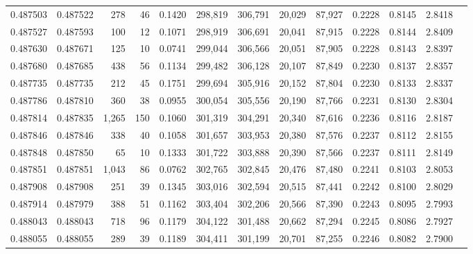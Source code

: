 \begin{tabular}{rrrrrrrrrrrrr}
0.487503 & 0.487522 &   278 &    46 &                                     0.1420 & 298,819 & 306,791 &  20,029 &  87,927 & 0.2228 & 0.8145 & 2.8418 \\
0.487527 & 0.487593 &   100 &    12 &                                     0.1071 & 298,919 & 306,691 &  20,041 &  87,915 & 0.2228 & 0.8144 & 2.8409 \\
0.487630 & 0.487671 &   125 &    10 &                                     0.0741 & 299,044 & 306,566 &  20,051 &  87,905 & 0.2228 & 0.8143 & 2.8397 \\
0.487680 & 0.487685 &   438 &    56 &                                     0.1134 & 299,482 & 306,128 &  20,107 &  87,849 & 0.2230 & 0.8137 & 2.8357 \\
0.487735 & 0.487735 &   212 &    45 &                                     0.1751 & 299,694 & 305,916 &  20,152 &  87,804 & 0.2230 & 0.8133 & 2.8337 \\
0.487786 & 0.487810 &   360 &    38 &                                     0.0955 & 300,054 & 305,556 &  20,190 &  87,766 & 0.2231 & 0.8130 & 2.8304 \\
0.487814 & 0.487835 & 1,265 &   150 &                                     0.1060 & 301,319 & 304,291 &  20,340 &  87,616 & 0.2236 & 0.8116 & 2.8187 \\
0.487846 & 0.487846 &   338 &    40 &                                     0.1058 & 301,657 & 303,953 &  20,380 &  87,576 & 0.2237 & 0.8112 & 2.8155 \\
0.487848 & 0.487850 &    65 &    10 &                                     0.1333 & 301,722 & 303,888 &  20,390 &  87,566 & 0.2237 & 0.8111 & 2.8149 \\
0.487851 & 0.487851 & 1,043 &    86 &                                     0.0762 & 302,765 & 302,845 &  20,476 &  87,480 & 0.2241 & 0.8103 & 2.8053 \\
0.487908 & 0.487908 &   251 &    39 &                                     0.1345 & 303,016 & 302,594 &  20,515 &  87,441 & 0.2242 & 0.8100 & 2.8029 \\
0.487914 & 0.487979 &   388 &    51 &                                     0.1162 & 303,404 & 302,206 &  20,566 &  87,390 & 0.2243 & 0.8095 & 2.7993 \\
0.488043 & 0.488043 &   718 &    96 &                                     0.1179 & 304,122 & 301,488 &  20,662 &  87,294 & 0.2245 & 0.8086 & 2.7927 \\
0.488055 & 0.488055 &   289 &    39 &                                     0.1189 & 304,411 & 301,199 &  20,701 &  87,255 & 0.2246 & 0.8082 & 2.7900 \\

\end{tabular}
